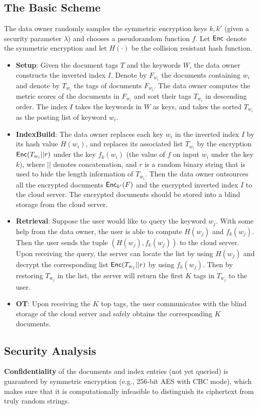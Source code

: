 \documentclass{IEEEtran}
\begin{document}
\subsection{The Basic Scheme}
The data owner randomly samples the symmetric encryption keys $k, k'$ (given a security parameter $\lambda$) and chooses a pseudorandom function $f$. Let $\textsf{Enc}$ denote the symmetric encryption and let $H(\cdot)$ be the collision resistant hash function. 
\begin{itemize}
\item {\bf Setup}: Given the document tags $T$ and the keywords $W$, the data owner constructs the inverted index $I$. Denote by $F_{w_i}$ the documents containing $w_i$ and denote by $T_{w_i}$ the tags of documents $F_{w_i}$. The data owner computes the metric scores of the documents in $F_{w_i}$ and sort their tags $T_{w_i}$ in descending order. The index $I$ takes the keywords in $W$ as keys, and takes the sorted $T_{w_i}$ as the posting list of keyword $w_i$. 
\item {\bf IndexBuild}: The data owner replaces each key $w_i$ in the inverted index $I$ by its hash value $H(w_i)$, and replaces its associated list $T_{w_i}$ by the encryption $\textsf{Enc}(T_{w_i}||r)$ under the key $f_k(w_i)$ (the value of $f$ on input $w_i$ under the key $k$), where $||$ denotes concatenation, and $r$ is a random binary string that is used to hide the length information of $T_{w_i}$. Then the data owner outsources all the encrypted documents $\textsf{Enc}_{k'}(F)$ and the encrypted inverted index $I$ to the cloud server. The encrypted documents should be stored into a blind storage from the cloud server.
\item {\bf Retrieval}: Suppose the user would like to query the keyword $w_j$. With some help from the data owner, the user is able to compute $H(w_j)$ and $f_k(w_j)$. Then the user sends the tuple $(H(w_j), f_k(w_j))$ to the cloud server. Upon receiving the query, the server can locate the list by using $H(w_j)$ and decrypt the corresponding list $\textsf{Enc}(T_{w_j}||r)$ by using $f_k(w_j)$. Then by restoring $T_{w_j}$ in the list, the server will return the first $K$ tags in $T_{w_j}$ to the user.
\item {\bf OT}: Upon receiving the $K$ top tags, the user communicates with the blind storage of the cloud server and safely obtains the corresponding $K$ documents.
\end{itemize}

\subsection{Security Analysis}
\textbf{Confidentiality} of the documents and index entries (not yet queried) is guaranteed by symmetric encryption (e.g., 256-bit AES with CBC mode), which makes sure that it is computationally infeasible to distinguish its ciphertext from truly random strings.
\end{document}
